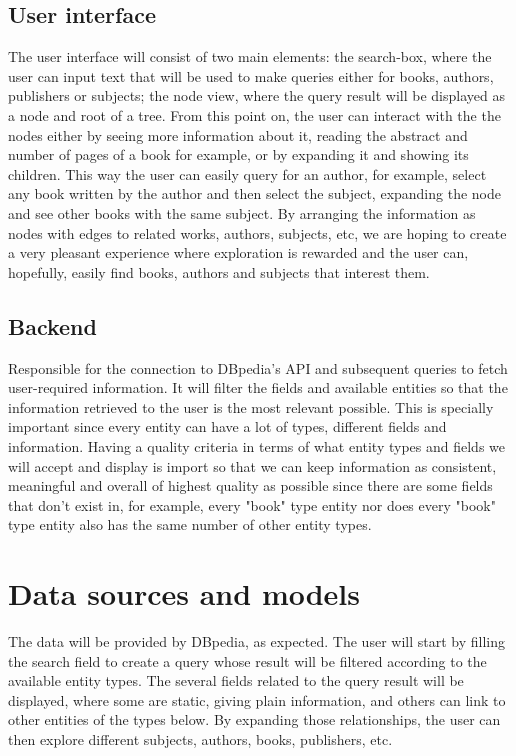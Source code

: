 \documentclass[twocolumn,twoside,11pt,a4paper]{article}
\begin{document}
\subsection{User interface} \label{userinterface} 

The user interface will consist of two main elements: the search-box, where the user can input text that will be used to make queries either for books, authors, publishers or subjects; the node view, where the query result will be displayed as a node and root of a tree. From this point on, the user can interact  with the the nodes either by seeing more information about it, reading the abstract and number of pages of a book for example, or by expanding it and showing its children. This way the user can easily query for an author, for example, select any book written by the author and then select the subject, expanding the node and see other books with the same subject.
By arranging the information as nodes with edges to related works, authors, subjects, etc, we are hoping to create a very pleasant experience where exploration is rewarded and the user can, hopefully, easily find books, authors and subjects that interest them.

\subsection{Backend} \label{backend} 

Responsible for the connection to DBpedia’s API and subsequent queries to fetch user-required information. It will filter the fields and available entities so that the information retrieved to the user is the most relevant possible. This is specially important since every entity can have a lot of types, different fields and information. Having a quality criteria in terms of what entity types and fields we will accept and display is import so that we can keep information as consistent, meaningful and overall of highest quality as possible since there are some fields that don't exist in, for example, every "book" type entity nor does every "book" type entity also has the same number of other entity types.


\section{Data sources and models}\label{sec:data}

The data will be provided by DBpedia, as expected. The user will start by filling the search field to create a query whose result will be filtered according to the available entity types. The several fields related to the query result will be displayed, where some are static, giving plain information, and others can link to other entities of the types below. By expanding those relationships, the user can then explore different subjects, authors, books, publishers, etc.
\end{document}
